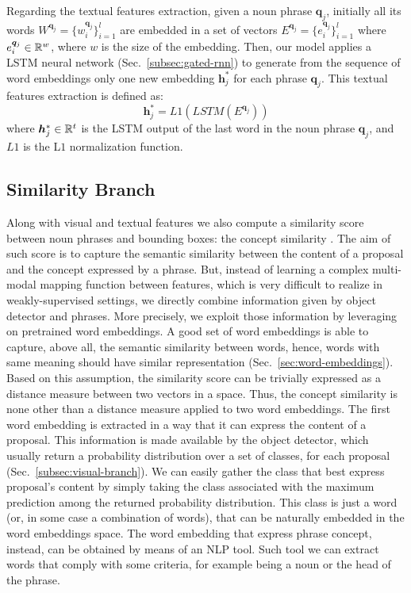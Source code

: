 Regarding the textual features extraction, given a noun phrase
$\bm{q}_j$, initially all its words $W^{\bm{q}_j} = \{ w^{\bm{q}_j}_i
\}^l_{i=1}$ are embedded in a set of vectors $E^{\bm{q}_j} =
\{e^{\bm{q}_j}_i \}^l_{i=1}$ where $e^{\bm{q}_j}_i \in \mathbb{R}^w$, where
$w$ is the size of the embedding. Then, our model applies a LSTM
neural network (Sec.~\ref{subsec:gated-rnn}) to generate from the
sequence of word embeddings only one new embedding $\bm{h}^*_j$ for
each phrase $\bm{q}_j$. This textual features extraction is defined
as:
\begin{equation}
  \bm{h}^*_j = L1(LSTM(E^{\bm{q}_j}))
  \label{eq:h-star}
\end{equation}
where $\bm{h}^*_j \in \mathbb{R}^t$ is the LSTM output of the last word in
the noun phrase $\bm{q}_j$, and $L1$ is the L$1$ normalization
function.

\subsection{Similarity Branch}
\label{subsec:similarity-branch}

Along with visual and textual features we also compute a similarity
score between noun phrases and bounding boxes: the concept similarity
\cite{wang2019phrase}. The aim of such score is to capture the
semantic similarity between the content of a proposal and the concept
expressed by a phrase. But, instead of learning a complex multi-modal
mapping function between features, which is very difficult to realize
in weakly-supervised settings, we directly combine information given
by object detector and phrases. More precisely, we exploit those
information by leveraging on pretrained word embeddings. A good set of
word embeddings is able to capture, above all, the semantic similarity
between words, hence, words with same meaning should have similar
representation (Sec.~\ref{sec:word-embeddings}). Based on this
assumption, the similarity score can be trivially expressed as a
distance measure between two vectors in a space. Thus, the concept
similarity is none other than a distance measure applied to two word
embeddings. The first word embedding is extracted in a way that it can
express the content of a proposal. This information is made available
by the object detector, which usually return a probability
distribution over a set of classes, for each proposal
(Sec.~\ref{subsec:visual-branch}). We can easily gather the class that
best express proposal's content by simply taking the class associated
with the maximum prediction among the returned probability
distribution. This class is just a word (or, in some case a
combination of words), that can be naturally embedded in the word
embeddings space. The word embedding that express phrase concept,
instead, can be obtained by means of an NLP tool. Such tool we can
extract words that comply with some criteria, for example being a noun
or the head of the phrase. 

